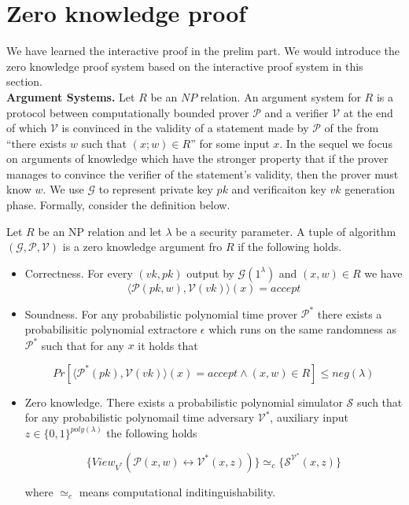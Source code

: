 
\section{Zero knowledge proof}

We have learned the interactive proof in the prelim part. We would introduce the zero knowledge proof system based on the interactive proof system in this section.\\

\noindent
\textbf{Argument Systems.} Let $R$ be an $NP$ relation. An argument system for $R$ is a protocol between
computationally bounded prover $\mathcal{P}$ and a verifier $\mathcal{V}$ at the end of which $\mathcal{V}$ is convinced in the validity of a statement made by $\mathcal{P}$ of the from “there exists $w$ such that $(x; w) \in R$” for some input $x$. In the sequel we focus on arguments of knowledge which have the stronger property that if the prover manages to convince
the verifier of the statement’s validity, then the prover must know $w$. We use $\mathcal{G}$ to represent private key $pk$ and verificaiton key $vk$ generation phase. Formally, consider the definition below.

\begin{definition}\label{def::zkpd}

Let $R$ be an NP relation and let $\lambda$ be a security parameter. A tuple of algorithm $(\mathcal{G}, \mathcal{P}, \mathcal{V})$ is a zero knowledge argument fro $R$ if the following holds.

\begin{itemize}

\item Correctness. For every $(vk, pk)$ output by $\mathcal{G}(1^\lambda)$ and $(x, w) \in R$ we have
$$\langle \mathcal{P}(pk, w), \mathcal{V}(vk) \rangle(x) = accept$$

\item Soundness. For any probabilistic polynomial time prover $\mathcal{P^*}$ there exists a probabilisitic polynomial extractore $\mathcal{\epsilon}$ which runs on the same randomness as $\mathcal{P^*}$ such that for any $x$ it holds that

$$Pr[\langle\mathcal{P^*}(pk), \mathcal{V}(vk) \rangle(x) = accept \wedge (x, w) \in R] \leq neg(\lambda)$$

\item Zero knowledge. There exists a probabilistic polynomial simulator $\mathcal{S}$ such that for any probabilistic polynomail time adversary $\mathcal{V^*}$, auxiliary input $z \in \{0, 1\}^{poly(\lambda)}$ the following holds

$$\{View_{V^*}(\mathcal{P}(x, w) \leftrightarrow \mathcal{V^*}(x, z))\} \simeq_{c} \{\mathcal{S}^{\mathcal{V^*}}(x, z)\}$$

where $\simeq_{c}$ means computational inditinguishability. 

\end{itemize}

\end{definition}